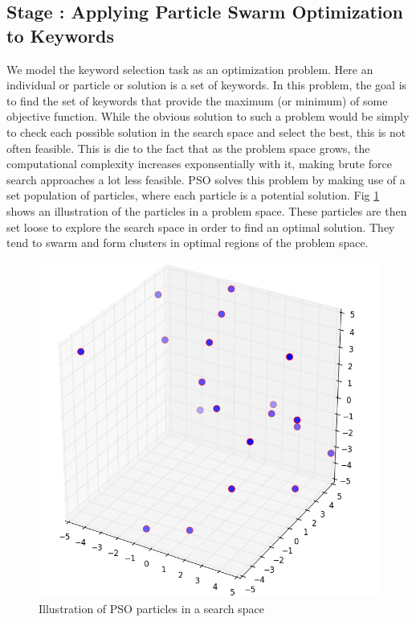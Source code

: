 \documentclass[runningheads]{llncs}
\newcommand{\RNum}[1]{\uppercase\expandafter{\romannumeral #1\relax}}
\begin{document}
\subsection{Stage \RNum{2}: Applying Particle Swarm Optimization to Keywords}
We model the keyword selection task as an optimization problem. Here an individual or particle or solution is a set of keywords. In this problem, the goal is to find the set of keywords that provide the maximum (or minimum) of some objective function. While the obvious solution to such a problem would be simply to check each possible solution in the search space and select the best, this is not often feasible. This is die to the fact that as the problem space grows, the computational complexity increases exponsentially with it, making brute force search approaches a lot less feasible. PSO solves this problem by making use of a set population of particles, where each particle is a potential solution. Fig \ref{fig:particle-space} shows an illustration of the particles in a problem space. These particles are then set loose to explore the search space in order to find an optimal solution. They tend to swarm and form clusters in optimal regions of the problem space.
\begin{figure}[h!]
	\centering
	\includegraphics[scale=0.3]{Images/particle_space.png}
	\caption{Illustration of PSO particles in a search space}
	\label{fig:particle-space}
\end{figure}
\end{document}
